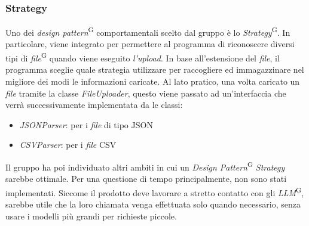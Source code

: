 \documentclass[5pt]{article}
\begin{document}
		\subsubsection{Strategy}
			Uno dei \textit{design pattern}\textsuperscript{G} comportamentali scelto dal gruppo è lo \textit{Strategy}\textsuperscript{G}. 
			In particolare, viene integrato per permettere al programma di riconoscere diversi tipi di \textit{file}\textsuperscript{G} quando viene eseguito \textit{l'upload}. In base all'estensione del \textit{file}, il programma sceglie quale strategia utilizzare per raccogliere ed immagazzinare nel migliore dei modi le informazioni caricate.
			Al lato pratico, una volta caricato un \textit{file} tramite la classe \textit{FileUploader}, questo viene passato ad un'interfaccia che verrà successivamente implementata da le classi:
			\begin{itemize}
				\item \textit{JSONParser}: per i \textit{file} di tipo JSON
				\item \textit{CSVParser}: per i \textit{file} CSV
			\end{itemize} 
			Il gruppo ha poi individuato altri ambiti in cui un \textit{Design Pattern}\textsuperscript{G} \textit{Strategy} sarebbe ottimale. Per una questione di tempo principalmente, non sono stati implementati. Siccome il prodotto deve lavorare a stretto contatto con gli \textit{LLM}\textsuperscript{G}, sarebbe utile che la loro chiamata venga effettuata solo quando necessario, senza usare i modelli più grandi per richieste piccole.  \\
	
\end{document}
